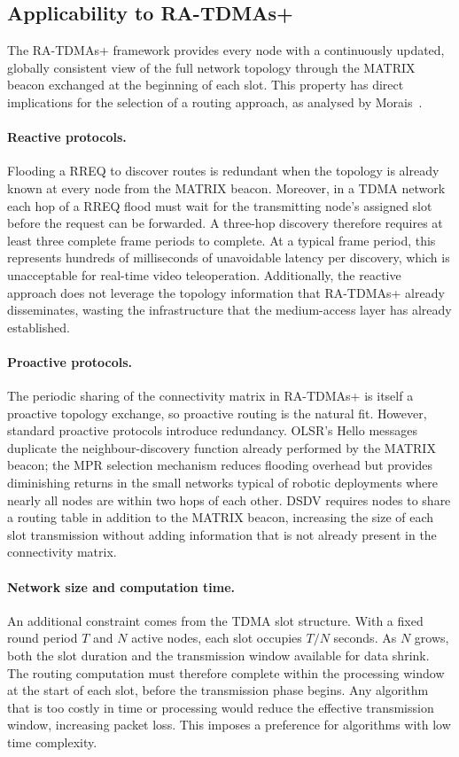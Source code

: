 \subsection{Applicability to RA-TDMAs+}
\label{sec:routing-applicability}

The RA-TDMAs+ framework provides every node with a continuously updated, globally
consistent view of the full network topology through the MATRIX beacon exchanged at the
beginning of each slot. This property has direct implications for the selection of a routing
approach, as analysed by Morais~\cite{morais2024synchronization}.

\paragraph{Reactive protocols.}
Flooding a RREQ to discover routes is redundant when the topology is already known at every
node from the MATRIX beacon. Moreover, in a TDMA network each hop of a RREQ flood
must wait for the transmitting node's assigned slot before the request can be forwarded. A
three-hop discovery therefore requires at least three complete frame periods to complete. At a
typical frame period, this represents hundreds of milliseconds of unavoidable latency per
discovery, which is unacceptable for real-time video teleoperation. Additionally, the reactive
approach does not leverage the topology information that RA-TDMAs+ already disseminates,
wasting the infrastructure that the medium-access layer has already established.

\paragraph{Proactive protocols.}
The periodic sharing of the connectivity matrix in RA-TDMAs+ is itself a proactive topology
exchange, so proactive routing is the natural fit. However, standard proactive protocols
introduce redundancy. OLSR's Hello messages duplicate the neighbour-discovery function
already performed by the MATRIX beacon; the MPR selection mechanism reduces flooding
overhead but provides diminishing returns in the small networks typical of robotic deployments
where nearly all nodes are within two hops of each other. DSDV requires nodes to share a
routing table in addition to the MATRIX beacon, increasing the size of each slot transmission
without adding information that is not already present in the connectivity matrix.

\paragraph{Network size and computation time.}
An additional constraint comes from the TDMA slot structure. With a fixed round period $T$
and $N$ active nodes, each slot occupies $T/N$ seconds. As $N$ grows, both the slot duration
and the transmission window available for data shrink. The routing computation must therefore
complete within the processing window at the start of each slot, before the transmission phase
begins. Any algorithm that is too costly in time or processing would reduce the effective
transmission window, increasing packet loss. This imposes a preference for algorithms with
low time complexity.

